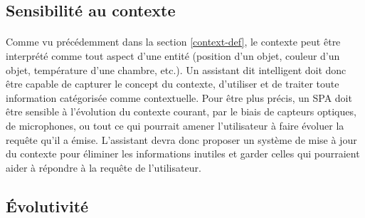 \subsection{Sensibilité au contexte}
\paragraph{}
Comme vu précédemment dans la section \ref{context-def}, le contexte peut être interprété comme tout aspect d'une entité (position d'un objet, couleur d'un objet, température d'une chambre, etc.). Un assistant dit intelligent doit donc être capable de capturer le concept du contexte, d'utiliser et de traiter toute information catégorisée comme contextuelle.
Pour être plus précis, un SPA doit être sensible à l'évolution du contexte courant, par le biais de capteurs optiques, de microphones, ou tout ce qui pourrait amener l'utilisateur à faire évoluer la requête qu'il a émise. L'assistant devra donc proposer un système de mise à jour du contexte pour éliminer les informations inutiles et garder celles qui pourraient aider à répondre à la requête de l'utilisateur.
\subsection{Évolutivité}
